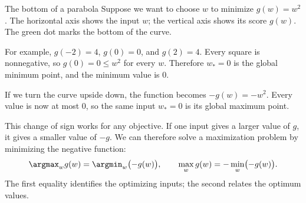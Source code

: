 \documentclass[a4paper,12pt,oneside]{report}
\begin{document}
\begin{framedexample}{The bottom of a parabola}
Suppose we want to choose $w$ to minimize $g(w)=w^2$. The horizontal
axis shows the input $w$; the vertical axis shows its score $g(w)$.
The green dot marks the bottom of the curve.

\begin{center}
\end{center}

For example, $g(-2)=4$, $g(0)=0$, and $g(2)=4$.
Every square is nonnegative, so $g(0)=0\leq w^2$ for every $w$.
Therefore $w_*=0$ is the global minimum point, and the minimum value
is $0$.

If we turn the curve upside down, the function becomes $-g(w)=-w^2$.
Every value is now at most $0$, so the same input $w_*=0$ is its
global maximum point.
\end{framedexample}

This change of sign works for any objective. If one input gives a
larger value of $g$, it gives a smaller value of $-g$. We can therefore
solve a maximization problem by minimizing the negative function:
\[
  \argmax_w g(w)=\argmin_w\bigl(-g(w)\bigr),\qquad
  \max_w g(w)=-\min_w\bigl(-g(w)\bigr).
\]
The first equality identifies the optimizing inputs; the second
relates the optimum values.
\end{document}
